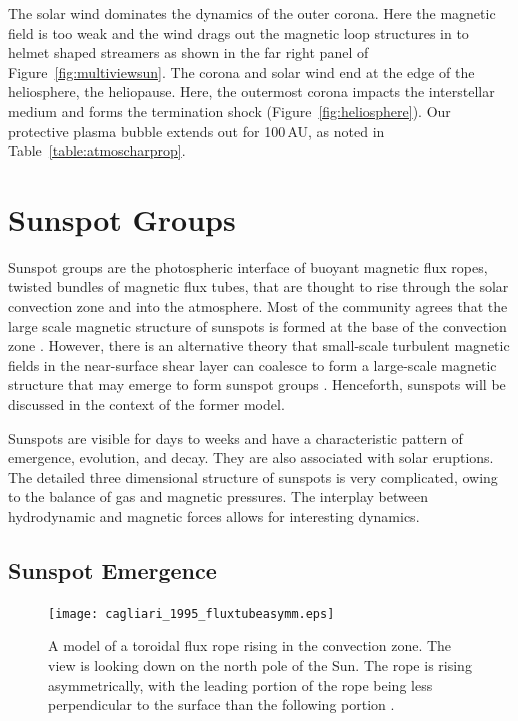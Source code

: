 
The solar wind dominates the dynamics of the outer corona. Here the magnetic field is too weak and the wind drags out the magnetic loop structures in to helmet shaped streamers as shown in the far right panel of Figure~\ref{fig:multiviewsun}. The corona and solar wind end at the edge of the heliosphere, the heliopause. Here, the outermost corona impacts the interstellar medium and forms the termination shock (Figure~\ref{fig:heliosphere}). Our protective plasma bubble extends out for 100\,AU, as noted in Table~\ref{table:atmoscharprop}.


\section{Sunspot Groups}\label{intro:aremerge}

Sunspot groups are the photospheric interface of buoyant magnetic flux ropes, twisted bundles of magnetic flux tubes, that are thought to rise through the solar convection zone and into the atmosphere. Most of the community agrees that the large scale magnetic structure of sunspots is formed at the base of the convection zone \citep{Spiegel:1980}. However, there is an alternative theory that small-scale turbulent magnetic fields in the near-surface shear layer can coalesce to form a large-scale magnetic structure that may emerge to form sunspot groups \citep{Brandenburg:2005}. Henceforth, sunspots will be discussed in the context of the former model. 

Sunspots are visible for days to weeks and have a characteristic pattern of emergence, evolution, and decay. They are also associated with solar eruptions. The detailed three dimensional structure of sunspots is very complicated, owing to the balance of gas and magnetic pressures. The interplay between hydrodynamic and magnetic forces allows for interesting dynamics.


\subsection{Sunspot Emergence}

\begin{figure}[t]
\centerline{\texttt{[image: cagliari\_1995\_fluxtubeasymm.eps]}}
\caption[A model of a toroidal flux rope rising in the convection zone.]{A model of a toroidal flux rope rising in the convection zone.  The view is looking down on the north pole of the Sun. The rope is rising asymmetrically, with the leading portion of the rope being less perpendicular to the surface than the following portion \citep[from:][]{Caligari:1995}.}
\label{fig:buoyantfluxtube}
\end{figure}

